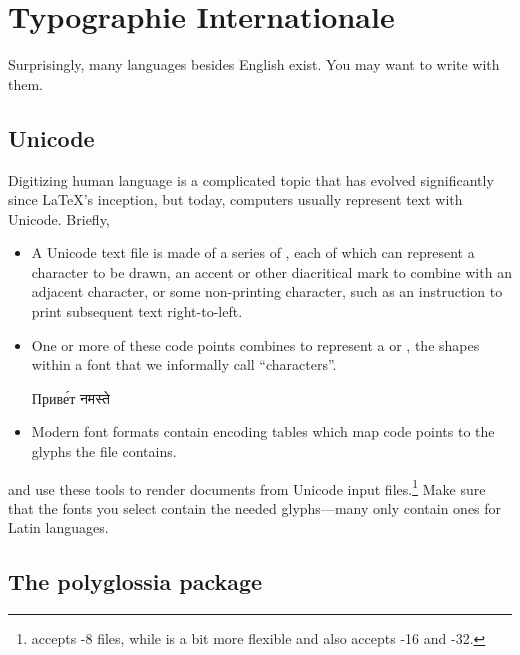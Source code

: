\chapter{Typographie Internationale}
\label{i18n}

Surprisingly, many languages besides English exist.
You may want to write with them.

\section{Unicode}

Digitizing human language is a complicated topic that has evolved significantly
since \LaTeX's inception, but today,
computers usually represent text with Unicode. Briefly,
\begin{itemize}
\item A Unicode text file is made of a series of ,
    each of which can represent a character to be drawn,
    an accent or other diacritical mark to combine with an adjacent character,
    or some non-printing character,
    such as an instruction to print subsequent text right-to-left.
\item One or more of these code points combines to represent a
     or ,
    the shapes within a font that we informally call ``characters''\quotekern.
\begin{centerfigure}
\large%
%
Приве́т
\quad{}%
नमस्ते
\end{centerfigure}
\item Modern font formats contain encoding tables
    which map code points to the glyphs the file contains.
\end{itemize}
\LuaLaTeX{} and \XeLaTeX{} use these tools to render documents
from Unicode input
files.\punckern\footnote{\LuaLaTeX{} accepts \mbox{-8} files,
while \XeLaTeX{} is a bit more flexible and also
accepts \mbox{-16} and
\mbox{-32}.}
Make sure that the fonts you select contain the needed glyphs---many
only contain ones for Latin languages.

\section{The polyglossia package}

